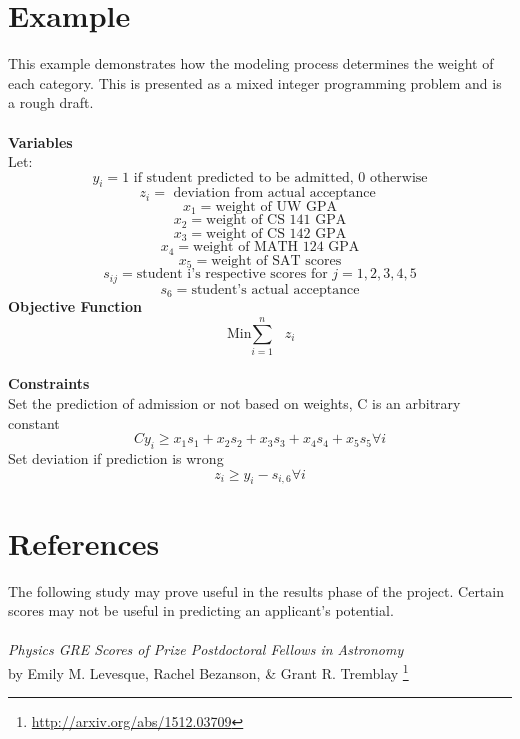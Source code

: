 \documentclass[11pt]{article}
\begin{document}
\section{Example}

This example demonstrates how the modeling process determines the weight of each category. This is presented as a mixed integer programming problem and is a rough draft.
\\\\
\textbf{Variables}\\
Let: \[y_i = 1 \text{ if student predicted to be admitted, } 0 \text{ otherwise}\]
\[z_i =  \text{ deviation from actual acceptance }\]
\[x_1 = \text{weight of UW GPA}\]
\[x_2 = \text{weight of CS 141 GPA}\]
\[x_3 = \text{weight of CS 142 GPA}\]
\[x_4 = \text{weight of MATH 124 GPA}\]
\[x_5 = \text{weight of SAT scores}\]
\[s_{ij} = \text{student i's respective scores for } j = 1,2,3,4,5\]
\[s_6 = \text{student's actual acceptance}\]
\textbf{Objective Function}
\[ \text{Min\(\sum\limits_{i=1}^n\) }z_i\]
\\
\textbf{Constraints}\\
Set the prediction of admission or not based on weights, C is an arbitrary constant
\[Cy_i \geq x_1s_1 + x_2s_2 + x_3s_3 + x_4s_4 + x_5s_5   \forall i\]
Set deviation if prediction is wrong
\[z_i \geq y_i - s_{i,6} \forall i\]


\section{References}
The following study may prove useful in the results phase of the project. Certain scores may not be useful in predicting an applicant's potential.\\\\
\emph{Physics GRE Scores of Prize Postdoctoral Fellows in Astronomy}\\ by Emily M. Levesque, Rachel Bezanson, \& Grant R. Tremblay \footnote{\url{http://arxiv.org/abs/1512.03709}}
\end{document}
